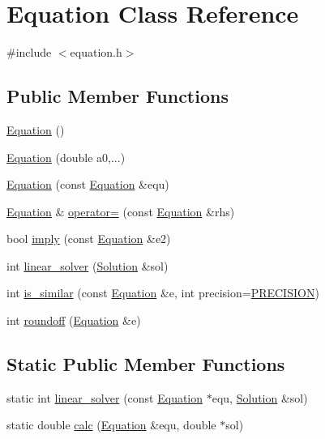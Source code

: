 \hypertarget{classEquation}{}\section{Equation Class Reference}
\label{classEquation}


{\ttfamily \#include $<$equation.\+h$>$}

\subsection*{Public Member Functions}
\begin{DoxyCompactItemize}
\item 
\hyperlink{classEquation_a68511fc719250ed80f86c50de9136733}{Equation} ()
\item 
\hyperlink{classEquation_a2899879892ff76b229b4f11c0ec1de78}{Equation} (double a0,...)
\item 
\hyperlink{classEquation_a81aaa52692da38c62bb684186912d91c}{Equation} (const \hyperlink{classEquation}{Equation} \&equ)
\item 
\hyperlink{classEquation}{Equation} \& \hyperlink{classEquation_a114154c932768fbe0e3587c10c44071d}{operator=} (const \hyperlink{classEquation}{Equation} \&rhs)
\item 
bool \hyperlink{classEquation_a0e6c0d52385361a604b5a8cab3d42e5e}{imply} (const \hyperlink{classEquation}{Equation} \&e2)
\item 
int \hyperlink{classEquation_a9ce8d3263523f807d35592797e8efd1a}{linear\+\_\+solver} (\hyperlink{classSolution}{Solution} \&sol)
\item 
int \hyperlink{classEquation_afa602708c6dc480ebdb8d05a7a7d367c}{is\+\_\+similar} (const \hyperlink{classEquation}{Equation} \&e, int precision=\hyperlink{config_8h_a9c7b069fee3c8184e14a7de8e5da2dc6}{P\+R\+E\+C\+I\+S\+I\+ON})
\item 
int \hyperlink{classEquation_a337d5e20578e86ac30257622e03b1fe4}{roundoff} (\hyperlink{classEquation}{Equation} \&e)
\end{DoxyCompactItemize}
\subsection*{Static Public Member Functions}
\begin{DoxyCompactItemize}
\item 
static int \hyperlink{classEquation_a061e5066dffec79ea306546da919ddbf}{linear\+\_\+solver} (const \hyperlink{classEquation}{Equation} $\ast$equ, \hyperlink{classSolution}{Solution} \&sol)
\item 
static double \hyperlink{classEquation_ada446e2cdda9e86007ae08a4c0f6537a}{calc} (\hyperlink{classEquation}{Equation} \&equ, double $\ast$sol)
\end{DoxyCompactItemize}
